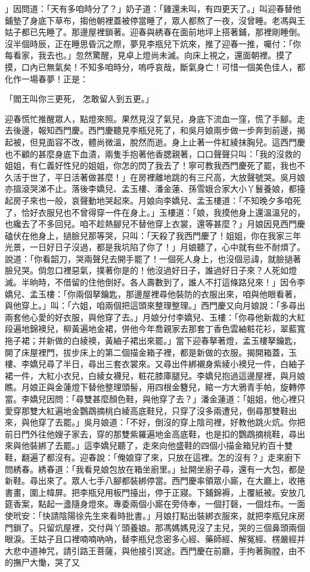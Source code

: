 」因問道：「天有多咱時分了？」奶子道：「雞還未叫，有四更天了。」叫迎春替他鋪墊了身底下草布，搊他朝裡蓋被停當睡了，眾人都熬了一夜，沒曾睡。老馮與王姑子都已先睡了。那邊屋裡鎖著。迎春與綉春在面前地坪上搭著鋪，那裡剛睡倒。沒半個時辰，正在睡思昏沉之際，夢見李瓶兒下炕來，推了迎春一推，囑付：「你每看家，我去也。」忽然驚醒，見卓上燈尚未滅。向床上視之，還面朝裡。摸了摸，口內已無氣矣！不知多咱時分，嗚呼哀哉，斷氣身亡！可惜一個美色佳人，都化作一場春夢！正是：

「閻王叫你三更死，  怎敢留人到五更。」

迎春慌忙推醒眾人，點燈來照。果然見沒了氣兒，身底下流血一窪，慌了手腳。走去後邊，報知西門慶。西門慶聽見李瓶兒死了，和吳月娘兩步做一步奔到前邊，揭起被，但見面容不改，體尚微溫，脫然而逝。身上止著一件紅綾抹胸兒。這西門慶也不顧的甚麼身底下血漬，兩隻手抱著他香腮親著，口口聲聲只叫：「我的沒救的姐姐，有仁義好性兒的姐姐，你怎的閃了我去了！寧可教我西門慶死了罷，我也不久活于世了，平日活著做甚麼！」在房裡離地跳的有三尺高，大放聲號哭。吳月娘亦搵滾哭涕不止。落後李嬌兒、孟玉樓、潘金蓮、孫雪娥合家大小丫鬟養娘，都擡起房子來也一般，哀聲動地哭起來。月娘向李嬌兒、孟玉樓道：「不知晚夕多咱死了，恰好衣服兒也不曾得穿一件在身上。」玉樓道：「娘，我摸他身上還溫溫兒的，也纔去了不多回兒。咱不趁熱腳兒不替他穿上衣裳，還等甚麼？」月娘因見西門慶磕伏在他身上，撾臉兒那等哭，只叫：「天殺了我西門慶了！姐姐，你在我家三年光景，一日好日子沒過，都是我坑陷了你了！」月娘聽了，心中就有些不耐煩了。說道：「你看韶刀，哭兩聲兒去開手罷了！一個死人身上，也沒個忌諱，就臉撾著臉兒哭。倘忽口裡惡氣，撲著你是的！他沒過好日子，誰過好日子來？人死如燈滅。半晌時，不借留的住他倒好。各人壽數到了，誰人不打這條路兒來！」因令李嬌兒、孟玉樓：「你兩個拏鑰匙，那邊屋裡尋他裝防的衣服出來，咱與他眼看著，與他穿上。」叫：「六姐，咱兩個把這頭來整理整理。」西門慶又向月娘說：「多尋出兩套他心愛的好衣服，與他穿了去。」月娘分付李嬌兒、玉樓：「你尋他新裁的大紅段遍地錦襖兒，柳黃遍地金裙，併他今年喬親家去那套丁香色雲紬粧花衫，翠藍寬拖子裙；并新做的白綾襖，黃紬子裙出來罷。」當下迎春拏著燈，孟玉樓拏鑰匙，開了床屋裡門，拔步床上的第二個描金箱子裡，都是新做的衣服。揭開箱蓋，玉樓、李嬌兒尋了半日，尋出三套衣裳來。又尋出件綁襯身紫綾小襖兒一件，白紬子裙一件，大紅小衣兒，白綾女襪兒，粧花膝庫腿兒。李嬌兒抱過這邊屋裡，與月娘瞧。月娘正與金蓮燈下替他整理頭髻，用四根金簪兒，綰一方大鴉青手帕，旋轉停當。李嬌兒因問：「尋雙甚麼顏色鞋，與他穿了去？」潘金蓮道：「姐姐，他心裡只愛穿那雙大紅遍地金鸚鵡摘桃白綾高底鞋兒，只穿了沒多兩遭兒，倒尋那雙鞋出來，與他穿了去罷。」吳月娘道：「不好，倒沒的穿上陰司裡，好教他跳火炕。你把前日門外往他嫂子家去，穿的那雙紫羅遍地金高底鞋，也是扣的鸚鵡摘桃鞋，尋出來與他裝綁了去罷。」這李嬌兒聽了，走來向他盛鞋的四個小描金箱兒約百十雙鞋，翻遍了都沒有。迎春說：「俺娘穿了來，只放在這裡。怎的沒有？」走來廚下問綉春。綉春道：「我看見娘包放在箱坐廚里。」扯開坐廚子尋，還有一大包，都是新鞋。尋出來了。眾人七手八腳都裝綁停當。西門慶率領眾小廝，在大廳上，收捲書畫，圍上幃屏。把李瓶兒用板門擡出，停于正寢。下鋪錦褥，上覆紙被。安放几筵香案，點起一盞隨身燈來。專委兩個小廝在旁侍奉，一個打磬，一個炷布。一面使玳安：「快請陰陽徐先生來看時批書。」月娘打點出裝綁衣服來，就把李瓶兒床房門鎖了。只留炕屋裡，交付與丫頭養娘。那馮媽媽見沒了主兒，哭的三個鼻頭兩個眼淚。王姑子且口裡喃喃吶吶，替李瓶兒念密多心經、藥師經、解冤經、楞嚴經并大悲中道神咒，請引路王菩薩，與他接引冥途。西門慶在前廳，手拘著胸膛，由不的撫尸大慟，哭了又